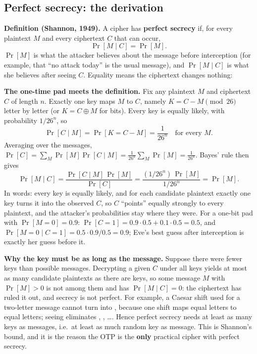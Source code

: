 \subsection{Perfect secrecy: the derivation}
\textbf{Definition (Shannon, 1949).} A cipher has \textbf{perfect secrecy} if, for every plaintext $M$ and every ciphertext $C$ that can occur,
\[
\Pr[M \mid C] = \Pr[M].
\]
$\Pr[M]$ is what the attacker believes about the message before interception (for example, that ``no attack today'' is the usual message), and $\Pr[M \mid C]$ is what she believes after seeing $C$. Equality means the ciphertext changes nothing: 

\textbf{The one-time pad meets the definition.} Fix any plaintext $M$ and ciphertext $C$ of length $n$. Exactly one key maps $M$ to $C$, namely $K = C - M \pmod{26}$ letter by letter (or $K = C \oplus M$ for bits). Every key is equally likely, with probability $1/26^n$, so
\[
\Pr[C \mid M] = \Pr[K = C - M] = \frac{1}{26^n}\quad\text{for every } M .
\]
Averaging over the messages, $\Pr[C] = \sum_{M} \Pr[M]\Pr[C \mid M] = \frac{1}{26^n}\sum_M \Pr[M] = \frac{1}{26^n}$. Bayes' rule then gives
\[
\Pr[M \mid C] = \frac{\Pr[C \mid M]\,\Pr[M]}{\Pr[C]} = \frac{(1/26^n)\,\Pr[M]}{1/26^n} = \Pr[M].
\]
In words: every key is equally likely, and for each candidate plaintext exactly one key turns it into the observed $C$, so $C$ ``points'' equally strongly to every plaintext, and the attacker's probabilities stay where they were. For a one-bit pad with $\Pr[M = 0] = 0.9$: $\Pr[C = 1] = 0.9 \cdot 0.5 + 0.1 \cdot 0.5 = 0.5$, and $\Pr[M = 0 \mid C = 1] = 0.5 \cdot 0.9 / 0.5 = 0.9$; Eve's best guess after interception is exactly her guess before it.

\textbf{Why the key must be as long as the message.} Suppose there were fewer keys than possible messages. Decrypting a given $C$ under all keys yields at most as many candidate plaintexts as there are keys, so some message $M$ with $\Pr[M] > 0$ is not among them and has $\Pr[M \mid C] = 0$: the ciphertext has ruled it out, and secrecy is not perfect. For example, a Caesar shift used for a two-letter message cannot turn  into , because one shift maps equal letters to equal letters; seeing  eliminates , , \dots. Hence perfect secrecy needs at least as many keys as messages, i.e.\ at least as much random key as message. This is Shannon's bound, and it is the reason the OTP is the \textbf{only} practical cipher with perfect secrecy.

